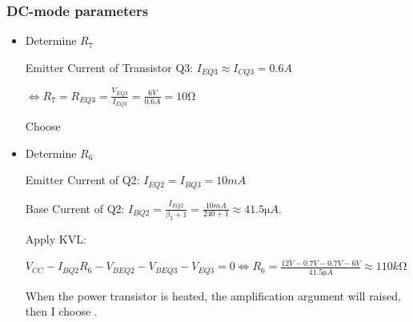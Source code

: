 \documentclass[twoside, a4paper, leqno]{article}
\begin{document}
	\subsubsection*{DC-mode parameters}
	\begin{itemize}
		\item Determine $R_7$
		
			Emitter Current of Transistor Q3: $I_{EQ3} \approx I_{CQ3} =  0.6A$
			
			$\Leftrightarrow R_7 = R_{EQ3} = \frac{V_{EQ3}}{I_{EQ3}} = \frac{6V}{0.6A} = 10\si{\ohm}$ 
			
			Choose 
		
		\item Determine $R_6$
		
			Emitter Current of Q2: $I_{EQ2} = I_{BQ3} = 10mA$
			
			Base Current of Q2: $I_{BQ2} = \frac{I_{EQ2}}{\beta_3+1} = \frac{10mA}{240+1} \approx 41.5\si{\micro}A$.
			
			Apply KVL:
			
			 $V_{CC} - I_{BQ2}R_6 - V_{BEQ2} - V_{BEQ3} - V_{EQ3} = 0 \Leftrightarrow R_6 = \frac{12V-0.7V-0.7V-6V}{41.5\si{\micro}A} \approx 110k\si{\ohm}$
			 
			 When the power transistor is heated, the amplification argument will raised, then I choose .
				
	\end{itemize}
	
\end{document}
